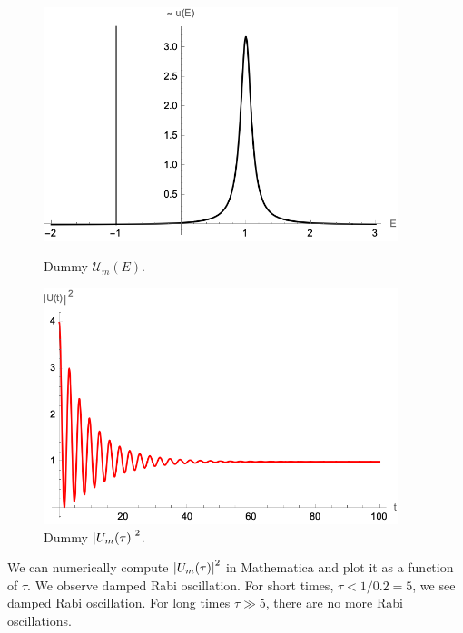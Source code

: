 \documentclass{article}
\theoremstyle{definition}
\begin{document}
\begin{enumerate}[label=(\alph*)]
\begin{figure}[!htb]
\centering
\begin{minipage}{0.45\textwidth}
\centering
\includegraphics[width=0.92\textwidth]{dummy_UmE.png}
\caption{Dummy $\mathcal{U}_m(E)$.}
\end{minipage}
\begin{minipage}{0.45\textwidth}
\centering
\includegraphics[width=0.92\textwidth]{dummy_UmT.png}
\caption{Dummy $\abs{{U}_m(\tau)}^2$.}
\end{minipage}
\end{figure}

We can numerically compute $\abs{U_m(\tau)}^2$ in Mathematica and plot it as a function of $\tau$. We observe damped Rabi oscillation. For short times, $\tau < 1/0.2 = 5$, we see damped Rabi oscillation. For long times $\tau \gg 5$, there are no more Rabi oscillations. 




\end{enumerate}
\end{document}
